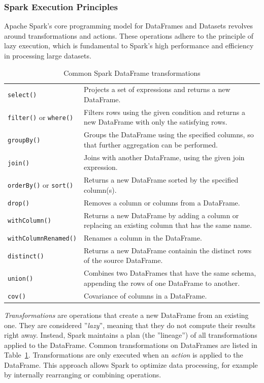 \subsubsection*{Spark Execution Principles}

Apache Spark's core programming model for DataFrames and Datasets revolves around transformations and actions. These operations adhere to the principle of lazy execution, which is fundamental to Spark's high performance and efficiency in processing large datasets.

\begin{table}
\renewcommand{\arraystretch}{1.25}

\begin{tabularx}{\textwidth}{l|X} \hline
\texttt{select()} & Projects a set of expressions and returns a new DataFrame. \\
\texttt{filter()} or \texttt{where()} & Filters rows using the given condition and returns a new DataFrame with only the satisfying rows. \\
\texttt{groupBy()} & Groups the DataFrame using the specified columns, so that further aggregation can be performed. \\
\texttt{join()} & Joins with another DataFrame, using the given join expression. \\
\texttt{orderBy()} or \texttt{sort()} & Returns a new DataFrame sorted by the specified column(s).\\
\texttt{drop()} & Removes a column or columns from a DataFrame.\\
\texttt{withColumn()} & Returns a new DataFrame by adding a column or replacing an existing column that has the same name.\\
\texttt{withColumnRenamed()} & Renames a column in the DataFrame. \\
\texttt{distinct()} & Returns a new DataFrame containin the distinct rows of the source DataFrame.\\
\texttt{union()} & Combines two DataFrames that have the same schema, appending the rows of one DataFrame to another.\\
\texttt{cov()} & Covariance of columns in a DataFrame.\\ \hline
\end{tabularx}
\caption{Common Spark DataFrame transformations}
\label{tab:sparktransformations}
\end{table}


\emph{Transformations} are operations that create a new DataFrame from an existing one. They are considered ''\emph{lazy}'', meaning that they do not compute their results right away. Instead, Spark maintains a plan (the ''lineage'') of all transformations applied to the DataFrame. Common transformations on DataFrames are listed in Table~\ref{tab:sparktransformations}. Transformations are only executed when an \emph{action} is applied to the DataFrame. This approach allows Spark to optimize data processing, for example by internally rearranging or combining operations.

